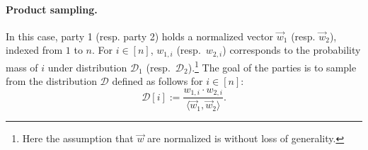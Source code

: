 


\paragraph{Product sampling.}
In this case, party 1 (resp. party 2) holds a normalized vector $\vec{w}_1$ (resp. $\vec{w}_2$),
indexed from $1$ to $n$. For $i \in [n]$, $w_{1,i}$
(resp.~$w_{2,i}$) corresponds to the probability mass of $i$ under distribution $\mathcal{D}_1$ (resp.~$\mathcal{D}_2$).\footnote{Here the assumption that $\vec{w}$ are normalized is without loss of generality.}
The goal of the parties is to sample from the distribution
$\mathcal{D}$ 
defined as follows for $i \in [n]$:
\[
\mathcal{D}[i] := \frac{w_{1,i} \cdot w_{2,i}}{\langle \vec{w}_1, \vec{w}_2 \rangle}.
\]

